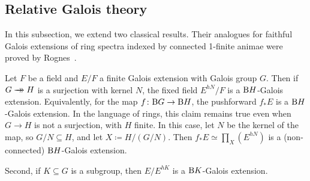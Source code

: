 \documentclass[english,svgnames,table]{article}
\begin{document}


\subsection{Relative Galois theory}
\label{subsec:relative-Galois}
    In this subsection, we extend two classical results. 
    Their analogues for faithful Galois extensions of ring spectra indexed by connected 1-finite animae were proved by Rognes~\cite[Theorem~7.2.3]{Rognes-2008-Galois}.
    
    Let $F$ be a field and $E / F$ a finite Galois extension with Galois group $G$. Then if $G \rightarrow\mathrel{\mkern-14mu}\rightarrow H$ is a surjection with kernel $N$, the fixed field $E^{hN} / F$ is a $\mathrm{B} H$-Galois extension. 
    Equivalently, for the map $f \colon \mathrm{B} G \to \mathrm{B} H$, the pushforward $f_* E$ is a $\mathrm{B} H$-Galois extension.
    In the language of rings, this claim remains true even when $G \to H$ is not a surjection, with $H$ finite. In this case, let $N$ be the kernel of the map, so $G/N \subseteq H$, and let $X \coloneq H / (G/N)$. Then $f_* E \simeq \prod_X(E^{hN})$ is a (non-connected) $\mathrm{B} H$-Galois extension.

    Second, if $K \subseteq G$ is a subgroup, then $E / E^{hK}$ is a $\mathrm{B} K$-Galois extension.
\end{document}
